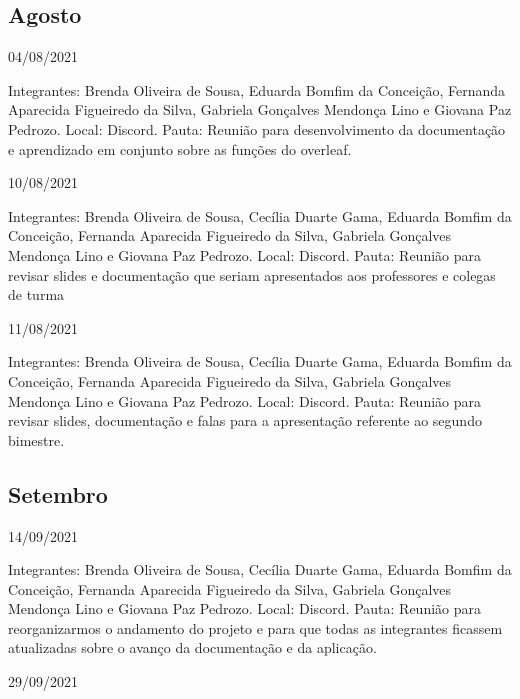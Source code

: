 \begin{apendicesenv}
\begin{flushleft}
 \section{Agosto}
 04/08/2021 

Integrantes: Brenda Oliveira de Sousa, Eduarda Bomfim da Conceição, Fernanda Aparecida Figueiredo da Silva, Gabriela Gonçalves Mendonça Lino e Giovana Paz Pedrozo.
\newline
Local: \gls{Discord}.
\newline
Pauta: Reunião para desenvolvimento da documentação e aprendizado em conjunto sobre as funções do overleaf.

10/08/2021 

Integrantes: Brenda Oliveira de Sousa, Cecília Duarte Gama, Eduarda Bomfim da Conceição, Fernanda Aparecida Figueiredo da Silva, Gabriela Gonçalves Mendonça Lino e Giovana Paz Pedrozo.
\newline
Local: \gls{Discord}.
\newline
Pauta: Reunião para revisar slides e documentação que seriam apresentados aos professores e colegas de turma

11/08/2021 

Integrantes: Brenda Oliveira de Sousa, Cecília Duarte Gama, Eduarda Bomfim da Conceição, Fernanda Aparecida Figueiredo da Silva, Gabriela Gonçalves Mendonça Lino e Giovana Paz Pedrozo.
\newline
Local: \gls{Discord}.
\newline
Pauta: Reunião para revisar slides, documentação e falas para a apresentação referente ao segundo bimestre.
\end{flushleft}

\begin{flushleft}
 \section{Setembro}
 14/09/2021 

Integrantes: Brenda Oliveira de Sousa, Cecília Duarte Gama, Eduarda Bomfim da Conceição, Fernanda Aparecida Figueiredo da Silva, Gabriela Gonçalves Mendonça Lino e Giovana Paz Pedrozo.
\newline
Local: \gls{Discord}.
\newline
Pauta: Reunião para reorganizarmos o andamento do projeto e para que todas as integrantes ficassem atualizadas sobre o avanço da documentação e da aplicação.

29/09/2021 


\end{flushleft}
\end{apendicesenv}
